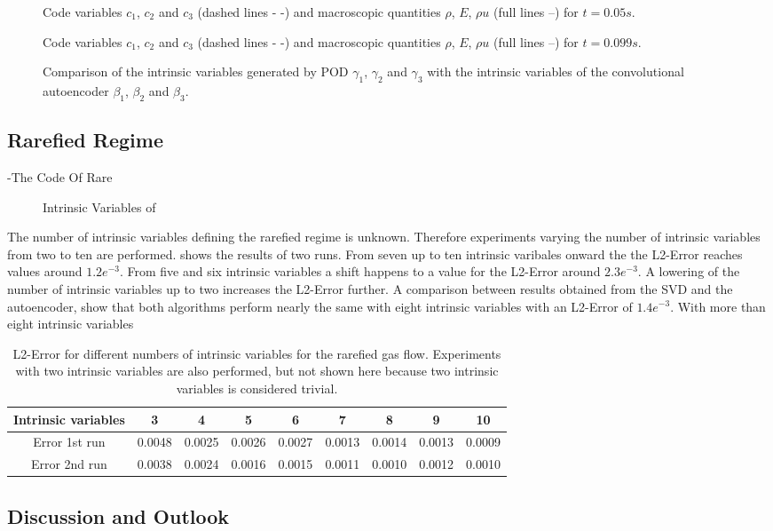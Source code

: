 \begin{figure}[!htbp]
	\scalebox{1}{}
	\caption{Code variables \(c_1\), \(c_2\) and \(c_3\) (dashed lines - -) and macroscopic quantities \(\rho\), \(E\), \(\rho u\) (full lines --) for \(t=0.05s\).}
\end{figure}
\begin{figure}[!htbp]
	\scalebox{1}{}
	\caption{Code variables \(c_1\), \(c_2\) and \(c_3\) (dashed lines - -) and macroscopic quantities \(\rho\), \(E\), \(\rho u\) (full lines --) for \(t=0.099s\).}
\end{figure}
\begin{figure}[!htbp]
	\scalebox{.6}{}
	\caption{Comparison of the intrinsic variables generated by POD \(\gamma_1\), \(\gamma_2\) and \(\gamma_3\) with the intrinsic variables of the convolutional autoencoder \(\beta_1\), \(\beta_2\) and \(\beta_3\).}
\end{figure}
\subsection{Rarefied Regime}
-The Code Of Rare
\begin{figure}[!hp]
	\scalebox{0.9}{}
	\caption{Intrinsic Variables of \rare}
\end{figure}
The number of intrinsic variables defining the rarefied regime is unknown. Therefore experiments varying the number of intrinsic variables from two to ten are performed.  shows the results of two runs. From seven up to ten intrinsic varibales onward the the L2-Error reaches values around \(1.2e^{-3}\). From five and six intrinsic variables a shift happens to a value for the L2-Error around \(2.3e^{-3}\). A lowering of the number of intrinsic variables up to two increases the L2-Error further. A comparison between results obtained from the SVD and the autoencoder, show that both algorithms perform nearly the same with eight intrinsic variables with an L2-Error of \(1.4e^{-3}\). With more than eight intrinsic variables  
\begin{table}[!htbp]\centering
	\begin{tabular}{ |c|c|c|c|c|c|c|c|c| }
		\hline
		Intrinsic variables  & 3 & 4 & 5 & 6 & 7 & 8 & 9 & 10 \\ [.5ex]
		\hline
		Error 1st run & 0.0048 & 0.0025 & 0.0026 & 0.0027 & 0.0013 & 0.0014 & 0.0013 & 0.0009\\ \hline
		Error 2nd run & 0.0038 & 0.0024 & 0.0016 & 0.0015 & 0.0011 & 0.0010 & 0.0012 & 0.0010\\\hline
	\end{tabular}
	\caption{L2-Error for different numbers of intrinsic variables for the rarefied gas flow. Experiments with two intrinsic variables are also performed, but not shown here because two intrinsic variables is considered trivial.}
	\label{Tab:Intrinsic units}
\end{table}
\subsection{Discussion and Outlook}